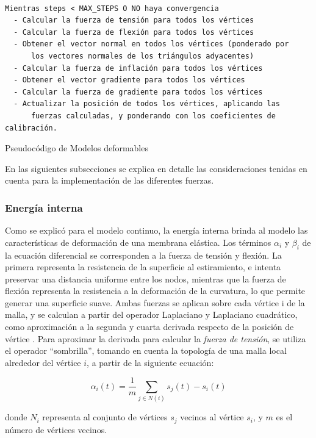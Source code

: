 \begin{program}
\begin{verbatim}

Mientras steps < MAX_STEPS O NO haya convergencia
  - Calcular la fuerza de tensión para todos los vértices
  - Calcular la fuerza de flexión para todos los vértices
  - Obtener el vector normal en todos los vértices (ponderado por 
      los vectores normales de los triángulos adyacentes)
  - Calcular la fuerza de inflación para todos los vértices
  - Obtener el vector gradiente para todos los vértices
  - Calcular la fuerza de gradiente para todos los vértices
  - Actualizar la posición de todos los vértices, aplicando las 
      fuerzas calculadas, y ponderando con los coeficientes de calibración.
\end{verbatim}
\caption{Pseudocódigo de Modelos deformables}
\label{alg:modelos_deformables}
\end{program}

En las siguientes subsecciones se explica en detalle las consideraciones tenidas en cuenta para la implementación de las diferentes fuerzas.

\subsubsection{Energía interna}\label{section:energia_interna}
Como se explicó para el modelo continuo, la energía interna brinda al modelo las características de deformación de una membrana elástica. Los términos $\alpha_{i}$ y $\beta_{i}$ de la ecuación diferencial se corresponden a la fuerza de tensión y flexión. La primera representa la resistencia de la superficie al estiramiento, e intenta preservar una distancia uniforme entre los nodos, mientras que la fuerza de flexión representa la resistencia a la deformación de la curvatura, lo que permite generar una superficie suave. Ambas fuerzas se aplican sobre cada vértice i de la malla, y se calculan a partir del operador Laplaciano y Laplaciano cuadrático, como aproximación a la segunda y cuarta derivada respecto de la posición de vértice \citep{mcinerney2000t}. Para aproximar la derivada para calcular la \emph{fuerza de tensión}, se utiliza el operador “sombrilla”, tomando en cuenta la topología de una malla local alrededor del vértice $i$, a partir de la siguiente ecuación:

$$ \alpha_{i}(t) = \dfrac{1}{m}\sum_{j\in N(i)} s_{j}(t) - s_{i}(t) $$

donde $N_{i}$ representa al conjunto de vértices $s_{j}$ vecinos al vértice $s_{i}$, y $m$ es el número de vértices  vecinos.

